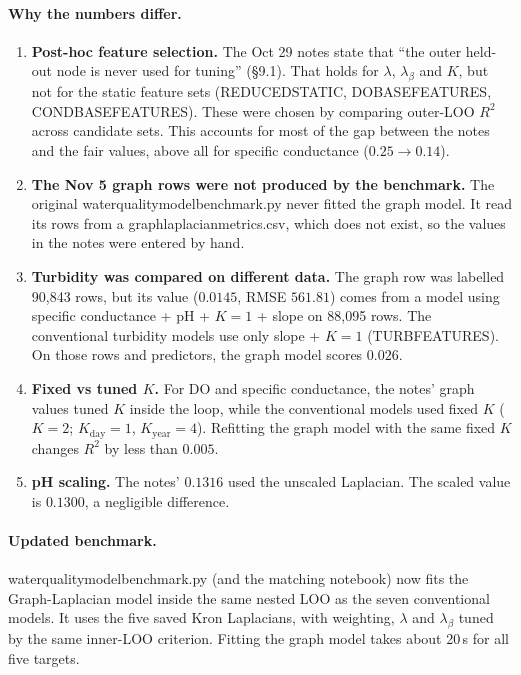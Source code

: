 \documentclass[11pt]{article}
\newcommand{\codeus}{\textunderscore\allowbreak}
\newcommand{\code}[1]{{\ttfamily\let\_\codeus #1}}
\begin{document}
\paragraph{Why the numbers differ.}
\begin{enumerate}
  \item \textbf{Post-hoc feature selection.} The Oct 29 notes state that ``the outer held-out node is
        never used for tuning'' (\S9.1). That holds for $\lambda$, $\lambda_\beta$ and $K$, but not for
        the static feature sets (\code{REDUCED\_STATIC}, \code{DO\_BASE\_FEATURES},
        \code{COND\_BASE\_FEATURES}). These were chosen by comparing outer-LOO $R^2$ across candidate
        sets. This accounts for most of the gap between the notes and the fair values, above all for
        specific conductance ($0.25 \to 0.14$).
  \item \textbf{The Nov 5 graph rows were not produced by the benchmark.} The original
        \code{water\_quality\_model\_benchmark.py} never fitted the graph model. It read its rows from a
        \code{graph\_laplacian\_metrics.csv}, which does not exist, so the values in the notes were
        entered by hand.
  \item \textbf{Turbidity was compared on different data.} The graph row was labelled 90{,}843 rows,
        but its value ($0.0145$, RMSE $561.81$) comes from a model using specific conductance + pH +
        $K{=}1$ + slope on 88{,}095 rows. The conventional turbidity models use only slope + $K{=}1$
        (\code{TURB\_FEATURES}). On those rows and predictors, the graph model scores $0.026$.
  \item \textbf{Fixed vs tuned $K$.} For DO and specific conductance, the notes' graph values tuned $K$
        inside the loop, while the conventional models used fixed $K$ ($K{=}2$; $K_{\text{day}}{=}1$,
        $K_{\text{year}}{=}4$). Refitting the graph model with the same fixed $K$ changes $R^2$ by
        less than $0.005$.
  \item \textbf{pH scaling.} The notes' $0.1316$ used the unscaled Laplacian. The scaled value is
        $0.1300$, a negligible difference.
\end{enumerate}

\paragraph{Updated benchmark.} \code{water\_quality\_model\_benchmark.py} (and the matching notebook)
now fits the Graph-Laplacian model inside the same nested LOO as the seven conventional models. It
uses the five saved Kron Laplacians, with weighting, $\lambda$ and $\lambda_\beta$ tuned by the same
inner-LOO criterion. Fitting the graph model takes about 20\,s for all five targets.
\end{document}
